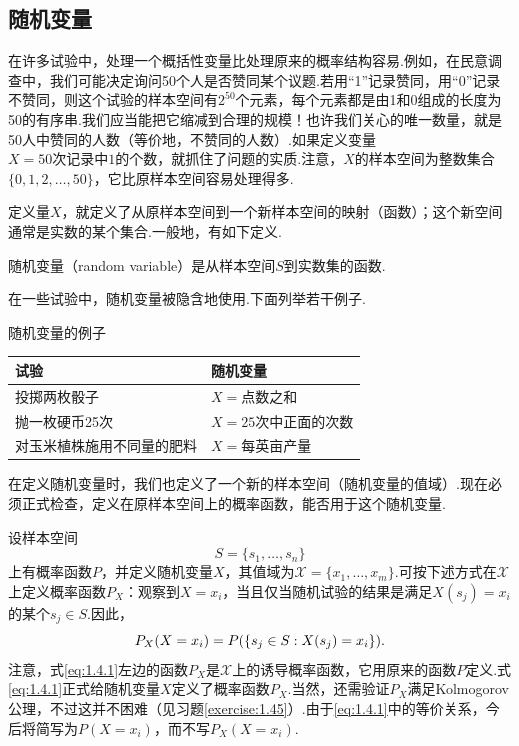 \subsection{随机变量}\label{sec:1.4}
在许多试验中，处理一个概括性变量比处理原来的概率结构容易.例如，在民意调查中，我们可能决定询问50个人是否赞同某个议题.若用“1”记录赞同，用“0”记录不赞同，则这个试验的样本空间有$2^{50}$个元素，每个元素都是由1和0组成的长度为50的有序串.我们应当能把它缩减到合理的规模！也许我们关心的唯一数量，就是50人中赞同的人数（等价地，不赞同的人数）.如果定义变量$X=\text{50次记录中1的个数}$，就抓住了问题的实质.注意，$X$的样本空间为整数集合$\{0,1,2,\ldots,50\}$，它比原样本空间容易处理得多.

定义量$X$，就定义了从原样本空间到一个新样本空间的映射（函数）；这个新空间通常是实数的某个集合.一般地，有如下定义.


\begin{definition}\label{def:1.4.1}
随机变量（random variable）是从样本空间$S$到实数集的函数.
\end{definition}

\begin{example}[随机变量]\label{ex:1.4.2}
在一些试验中，随机变量被隐含地使用.下面列举若干例子.
\begin{center}
随机变量的例子\par\smallskip
\begin{tabular}{p{.40\linewidth}p{.47\linewidth}}\hline
试验&随机变量\\\hline
投掷两枚骰子&$X=\text{点数之和}$\\
抛一枚硬币25次&$X=\text{25次中正面的次数}$\\
对玉米植株施用不同量的肥料&$X=\text{每英亩产量}$\\\hline
\end{tabular}
\end{center}
\end{example}

在定义随机变量时，我们也定义了一个新的样本空间（随机变量的值域）.现在必须正式检查，定义在原样本空间上的概率函数，能否用于这个随机变量.

设样本空间
$$S=\{s_1,\ldots,s_n\}$$
上有概率函数$P$，并定义随机变量$X$，其值域为$\mathscr X=\{x_1,\ldots,x_m\}$.可按下述方式在$\mathscr X$上定义概率函数$P_X$：观察到$X=x_i$，当且仅当随机试验的结果是满足$X(s_j)=x_i$的某个$s_j\in S$.因此，
\begin{equation}\label{eq:1.4.1}\index{SI0598@诱导概率}\index{SI0845@诱导}
P_X(X=x_i)=P(\{s_j\in S:X(s_j)=x_i\}).
\end{equation}
注意，式\eqref{eq:1.4.1}左边的函数$P_X$是$\mathscr X$上的诱导概率函数，它用原来的函数$P$定义.式\eqref{eq:1.4.1}正式给随机变量$X$定义了概率函数$P_X$.当然，还需验证$P_X$满足Kolmogorov公理，不过这并不困难（见习题\ref{exercise:1.45}）.由于\eqref{eq:1.4.1}中的等价关系，今后将简写为$P(X=x_i)$，而不写$P_X(X=x_i)$.

